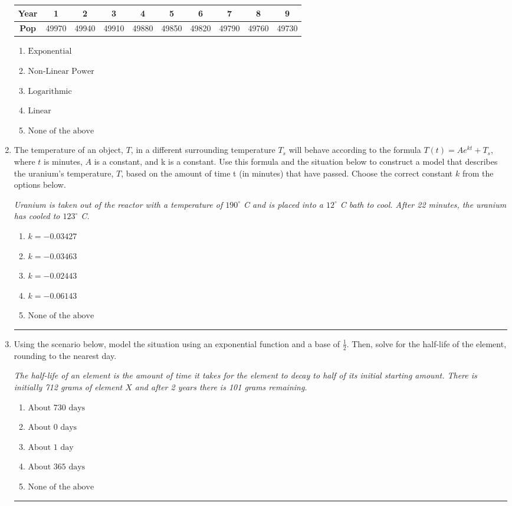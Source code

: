 \documentclass[14pt]{extbook}
\newcommand{\litem}[1]{\item#1\hspace*{-1cm}\rule{\textwidth}{0.4pt}}
\begin{document}
\begin{enumerate}
{\begin{tabular}{c|c|c|c|c|c|c|c|c|c}
\textbf{Year} &1 &2 &3 &4 &5 &6 &7 &8 &9\tabularnewline \hline
\textbf{Pop} &49970 &49940 &49910 &49880 &49850 &49820 &49790 &49760 &49730\end{tabular}\begin{enumerate}[label=\Alph*.]
\item \( \text{Exponential} \)
\item \( \text{Non-Linear Power} \)
\item \( \text{Logarithmic} \)
\item \( \text{Linear} \)
\item \( \text{None of the above} \)

\end{enumerate} }
\litem{
The temperature of an object, $T$, in a different surrounding temperature $T_s$ will behave according to the formula $T(t) = Ae^{kt} + T_s$, where $t$ is minutes, $A$ is a constant, and k is a constant. Use this formula and the situation below to construct a model that describes the uranium's temperature, $T$, based on the amount of time t (in minutes) that have passed. Choose the correct constant $k$ from the options below.
\begin{center}
    \textit{ Uranium is taken out of the reactor with a temperature of $190^{\circ}$ C and is placed into a $12^{\circ}$ C bath to cool. After 22 minutes, the uranium has cooled to $123^{\circ}$ C. }
\end{center}
\begin{enumerate}[label=\Alph*.]
\item \( k = -0.03427 \)
\item \( k = -0.03463 \)
\item \( k = -0.02443 \)
\item \( k = -0.06143 \)
\item \( \text{None of the above} \)

\end{enumerate} }
\litem{
Using the scenario below, model the situation using an exponential function and a base of $\frac{1}{2}$. Then, solve for the half-life of the element, rounding to the nearest day.
\begin{center}
    \textit{ The half-life of an element is the amount of time it takes for the element to decay to half of its initial starting amount. There is initially 712 grams of element $X$ and after 2 years there is 101 grams remaining. }
\end{center}
\begin{enumerate}[label=\Alph*.]
\item \( \text{About } 730 \text{ days} \)
\item \( \text{About } 0 \text{ days} \)
\item \( \text{About } 1 \text{ day} \)
\item \( \text{About } 365 \text{ days} \)
\item \( \text{None of the above} \)


\end{enumerate}}
\end{enumerate}
\end{document}
